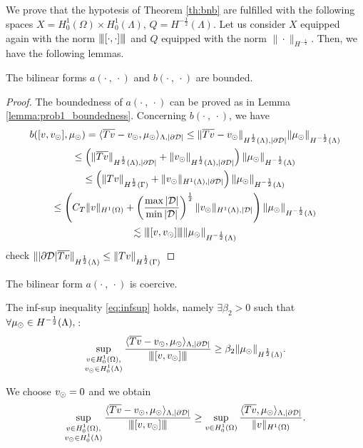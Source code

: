 We prove that the hypotesis of  Theorem \ref{th:bnb} are fulfilled with the following spaces $X=H^1_0(\Omega) \times H^1_0(\Lambda)$, $Q=H^{-\frac 12}(\Lambda)$.
Let us consider $X$ equipped again with the norm ${\left\vert\kern-0.25ex\left\vert\kern-0.25ex\left\vert [\cdot,\cdot ] \right\vert\kern-0.25ex\right\vert\kern-0.25ex\right\vert}$ and  
$Q$ equipped with the norm $\|\cdot \|_{H^{-\frac 12}}$.
Then, we have the following lemmas.
\begin{lemma}
The bilinear forms $a(\cdot \ , \ \cdot)$ and $b(\cdot \ , \ \cdot)$ are bounded.
\end{lemma}
\begin{proof}
The boundedness of $a(\cdot \ , \ \cdot)$ can be proved as in Lemma \ref{lemma:prob1_boundedness}. Concerning $b(\cdot \ , \ \cdot)$, we have
\begin{multline*}
b([v, v_{\odot}], \mu_{\odot})=  \langle  \overline{Tv} - v_{\odot}, \mu_{\odot} \rangle_{\Lambda, |\partial\mathcal{D}|} 
\leq \|\overline{Tv} - v_{\odot}\|_{H^{\frac 12 }(\Lambda), |\partial\mathcal{D}|}\|\mu_{\odot}\|_{H^{-\frac 12}(\Lambda)}\\
\leq \left(\|\overline{Tv}\|_{H^{\frac 12 }(\Lambda), |\partial\mathcal{D}|}+\|v_{\odot}\|_{H^{\frac 12 }(\Lambda), |\partial\mathcal{D}|}\right)\|\mu_{\odot}\|_{H^{-\frac 12}(\Lambda)} \\
\leq \left(\|Tv\|_{H^{\frac 12 }(\Gamma)}+ \|v_{\odot}\|_{H^1(\Lambda), |\partial\mathcal{D}|}\right)\|\mu_{\odot}\|_{H^{-\frac 12}(\Lambda)} \\
\leq \left(C_T\|v\|_{H^1(\Omega)}+ \left(\frac{\max |\mathcal{D}|}{\min |\mathcal{D}|}\right)^{\frac 12} \|v_{\odot}\|_{H^1(\Lambda), |\mathcal{D}|}\right) \|\mu_{\odot}\|_{H^{-\frac 12}(\Lambda)} \\
\lesssim {\left\vert\kern-0.25ex\left\vert\kern-0.25ex\left\vert [v,v_{\odot}] \right\vert\kern-0.25ex\right\vert\kern-0.25ex\right\vert}\|\mu_{\odot}\|_{H^{-\frac 12}(\Lambda)} 
\end{multline*}
{\color{red} check $\||\partial\mathcal{D}| \overline{Tv}\|_{H^{\frac 12}(\Lambda)}\leq \|Tv\|_{H^{\frac 12}(\Gamma)}$} 
\end{proof}

\begin{lemma}\label{lemma:prob2_coercivity}
The bilinear form $a(\cdot \ , \ \cdot)$ is coercive.
\end{lemma}

\begin{lemma}
The inf-sup inequality \eqref{eq:infsup} holds, namely $ \exists \beta_2 >0$ such that $\forall \mu_{\odot} \in H^{-\frac 12}(\Lambda),\,$:
\begin{equation*}
\sup _{\substack{v\in H^1_0(\Omega),\\ v_{\odot} \in H^1_0(\Lambda)}} \frac{ \langle \overline{T v} - v_{\odot}, \mu_{\odot} \rangle_{\Lambda,|\partial\mathcal{D}|}}{{\left\vert\kern-0.25ex\left\vert\kern-0.25ex\left\vert [v,v_{\odot}] \right\vert\kern-0.25ex\right\vert\kern-0.25ex\right\vert}}
\geq \beta_2 \|\mu_{\odot}\|_{H^{\frac 12}(\Lambda)}.
\end{equation*}
\end{lemma} 
We choose $v_{\odot}=0$ and we obtain
\begin{equation*}
\sup _{\substack{v\in H^1_0(\Omega),\\ v_{\odot} \in H^1_0(\Lambda)}} \frac{ \langle \overline{T v} - v_{\odot}, \mu_{\odot} \rangle_{\Lambda,|\partial\mathcal{D}|}}{{\left\vert\kern-0.25ex\left\vert\kern-0.25ex\left\vert [v,v_{\odot}] \right\vert\kern-0.25ex\right\vert\kern-0.25ex\right\vert}}
\geq \sup _{v\in H^1_0(\Omega)} \frac{ \langle \overline{T v}, \mu_{\odot} \rangle_{\Lambda,|\partial\mathcal{D}|}}{\|v\|_{H^1(\Omega)}}. 
\end{equation*}

